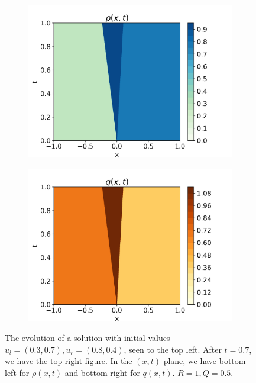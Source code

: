 \documentclass[10pt]{article}
\numberwithin{equation}{section}
\begin{document}
\begin{figure}
\begin{subfigure}[b]{0.35\textwidth}
         \includegraphics[width=\textwidth]{Figures/Model/Plots/SysShockRho.png}
     \end{subfigure}
     \begin{subfigure}[b]{0.35\textwidth}
         \centering
         \includegraphics[width=\textwidth]{Figures/Model/Plots/SysShockQ.png}
     \end{subfigure}
        \caption{The evolution of a solution with initial values $u_l = (0.3, 0.7), u_r = (0.8, 0.4)$, seen to the top left. After $t = 0.7$, we have the top right figure. In the $(x,t)$-plane, we have bottom left for $\rho(x,t)$ and bottom right for $q(x,t)$. $R = 1, Q = 0.5$.}
        \label{fig:ExampleSysShock}
\end{figure}
\end{document}
